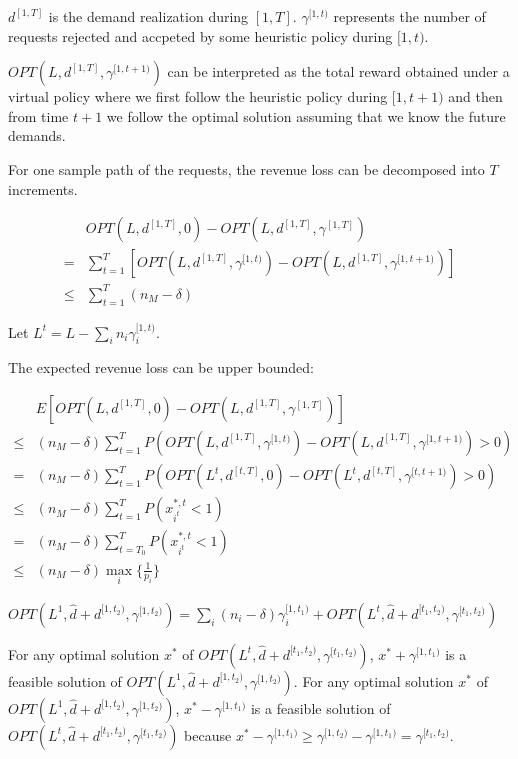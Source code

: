 $d^{[1, T]}$ is the demand realization during $[1, T]$. $\gamma^{[1, t)}$ represents the number of requests rejected and accpeted by some heuristic policy during $[1, t)$. 

$OPT(L, d^{[1, T]}, \gamma^{[1,t+1)})$ can be interpreted as the total reward obtained under a virtual policy where we first follow the heuristic policy during $[1, t+1)$ and then from time $t+1$ we follow the optimal solution assuming that we know the future demands.

For one sample path of the requests, the revenue loss can be decomposed into $T$ increments.

\begin{align*}
    & OPT(L, d^{[1, T]}, 0) - OPT(L, d^{[1, T]}, \gamma^{[1, T]}) \\
 = & \sum_{t=1}^{T} [OPT(L, d^{[1,T]}, \gamma^{[1,t)}) - OPT(L, d^{[1,T]}, \gamma^{[1,t+1)})] \\
 \leq & \sum_{t=1}^{T} (n_{M} - \delta)
\end{align*}

Let $L^{t} = L-\sum_{i}n_{i} \gamma_{i}^{[1,t)}$.

The expected revenue loss can be upper bounded:

\begin{align*}
    & E[OPT(L, d^{[1, T]}, 0) - OPT(L, d^{[1, T]}, \gamma^{[1, T]})] \\
 \leq & (n_{M} - \delta) \sum_{t=1}^{T} P(OPT(L, d^{[1, T]}, \gamma^{[1,t)}) - OPT(L, d^{[1, T]}, \gamma^{[1,t+1)}) > 0) \\
 = & (n_{M} - \delta) \sum_{t=1}^{T} P(OPT(L^{t}, d^{[t, T]}, 0) - OPT(L^{t}, d^{[t, T]}, \gamma^{[t,t+1)}) > 0) \\
 \leq & (n_{M} - \delta) \sum_{t=1}^{T} P(x_{i^{t}}^{*,t} <1) \\
 = & (n_{M} - \delta) \sum_{t=T_{0}}^{T} P(x_{i^{t}}^{*,t} <1) \\
 \leq & (n_{M} - \delta) \max_{i}\{\frac{1}{p_{i}}\} 
\end{align*}


\begin{lem}
$OPT(L^{1}, \hat{d} + d^{[1, t_2)} , \gamma^{[1, t_2)}) = \sum_{i} (n_{i} - \delta) \gamma_{i}^{[1, t_1)} + OPT(L^{t}, \hat{d}+d^{[t_1, t_2)}, \gamma^{[t_1, t_2)})$
\end{lem}

For any optimal solution $x^{*}$ of $OPT(L^{t}, \hat{d}+d^{[t_1, t_2)}, \gamma^{[t_1, t_2)})$, $x^{*} + \gamma^{[1, t_1)}$ is a feasible solution of $OPT(L^{1}, \hat{d}+d^{[1, t_2)}, \gamma^{[1, t_2)})$. For any optimal solution $x^{*}$ of $OPT(L^{1}, \hat{d}+d^{[1, t_2)}, \gamma^{[1, t_2)})$, $x^{*}- \gamma^{[1, t_1)}$ is a feasible solution of $OPT(L^{t}, \hat{d}+d^{[t_1, t_2)}, \gamma^{[t_1, t_2)})$ because $x^{*}- \gamma^{[1, t_1)} \geq \gamma^{[1, t_{2})}- \gamma^{[1, t_1)} = \gamma^{[t_1, t_2)}$.


